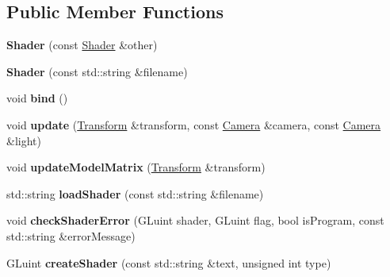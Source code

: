 \subsection*{Public Member Functions}
\begin{DoxyCompactItemize}
\item 
\hypertarget{classShader_adab8e450ec1f4509c1bdf147e47a871c}{{\bfseries Shader} (const \hyperlink{classShader}{Shader} \&other)}\label{classShader_adab8e450ec1f4509c1bdf147e47a871c}

\item 
\hypertarget{classShader_aab6796612c50cc11ad6ebf31c4c4386d}{{\bfseries Shader} (const std\-::string \&filename)}\label{classShader_aab6796612c50cc11ad6ebf31c4c4386d}

\item 
\hypertarget{classShader_a6f6e280a343d6c7662909f7dfbc89ad9}{void {\bfseries bind} ()}\label{classShader_a6f6e280a343d6c7662909f7dfbc89ad9}

\item 
\hypertarget{classShader_a74c581ab1f89b2e0b623fe14b2542999}{void {\bfseries update} (\hyperlink{classTransform}{Transform} \&transform, const \hyperlink{classCamera}{Camera} \&camera, const \hyperlink{classCamera}{Camera} \&light)}\label{classShader_a74c581ab1f89b2e0b623fe14b2542999}

\item 
\hypertarget{classShader_a9853e4719c8e8868744cbb14750f3767}{void {\bfseries update\-Model\-Matrix} (\hyperlink{classTransform}{Transform} \&transform)}\label{classShader_a9853e4719c8e8868744cbb14750f3767}

\item 
\hypertarget{classShader_ad4b47f4c3c273eb5f25472d5c477f9da}{std\-::string {\bfseries load\-Shader} (const std\-::string \&filename)}\label{classShader_ad4b47f4c3c273eb5f25472d5c477f9da}

\item 
\hypertarget{classShader_a4d8e2cbfa4889ab97c2b2e54f3fdd62d}{void {\bfseries check\-Shader\-Error} (G\-Luint shader, G\-Luint flag, bool is\-Program, const std\-::string \&error\-Message)}\label{classShader_a4d8e2cbfa4889ab97c2b2e54f3fdd62d}

\item 
\hypertarget{classShader_a65ee42cf2fa9d095ec64e713ff58935b}{G\-Luint {\bfseries create\-Shader} (const std\-::string \&text, unsigned int type)}\label{classShader_a65ee42cf2fa9d095ec64e713ff58935b}

\end{DoxyCompactItemize}
